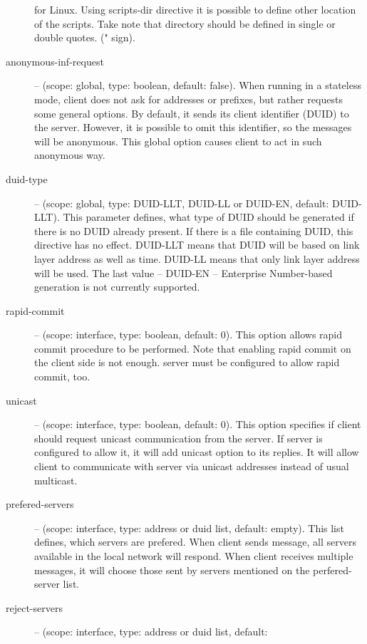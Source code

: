 \begin{description}
            for Linux. Using scripts-dir directive it is possible to
            define other location of the scripts. Take note that
            directory should be defined in single or double quotes.
            (" sign).
\item[anonymous-inf-request] -- (scope: global, type: boolean,
            default: false). When running in a stateless mode, client
            does not ask for addresses or prefixes, but rather
            requests some general options. By default, it sends its
            client identifier (DUID) to the server. However, it is
            possible to omit this identifier, so the 
            messages will be anonymous. This global option causes
            client to act in such anonymous way.
 \item[duid-type] -- (scope: global, type: DUID-LLT, DUID-LL or DUID-EN,
	    default: DUID-LLT). This parameter defines, what type of
	    DUID should be generated if there is no DUID already
	    present. If there is a file containing DUID, this directive
	    has no effect. DUID-LLT means that DUID will be based on
	    link layer address as well as time. DUID-LL means that only
	    link layer address will be used. The last value -- DUID-EN
	    -- Enterprise Number-based generation is not currently
	    supported.
 \item[rapid-commit] -- (scope: interface, type: boolean, default:
	    0). This option allows rapid commit procedure to be
	    performed. Note that enabling rapid commit on the client
	    side is not enough. server must be configured to allow
	    rapid commit, too.
 \item[unicast] -- (scope: interface, type: boolean, default: 0). This
	    option specifies if client should request unicast
	    communication from the server. If server is configured to
	    allow it, it will add unicast option to its replies. It will
	    allow client to communicate with server via unicast
	    addresses instead of usual multicast.
 \item[prefered-servers] -- (scope: interface, type: address or duid list, default:
	    empty). This list defines, which servers are prefered. When
	    client sends  message, all servers available in
	    the local network will respond. When client receives
	    multiple  messages, it will choose those sent
	    by servers mentioned on the perfered-server list.
 \item[reject-servers] -- (scope: interface, type: address or duid list, default:

\end{description}
